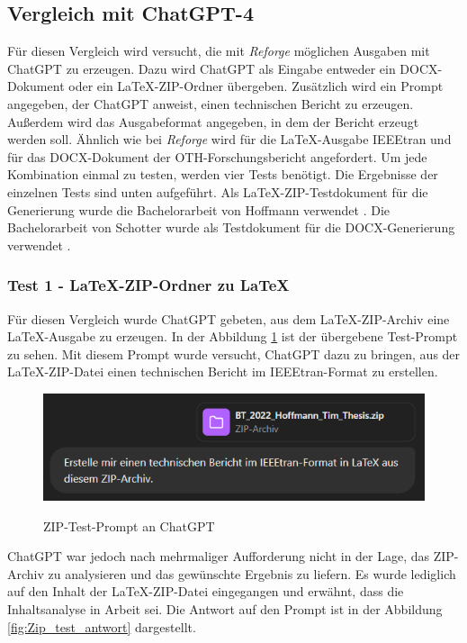 \subsection{Vergleich mit ChatGPT-4}
Für diesen Vergleich wird versucht, die mit \textit{Reforge} möglichen Ausgaben mit Chat\ac{GPT} zu erzeugen. Dazu wird Chat\ac{GPT} als Eingabe entweder ein \ac{DOCX}-Dokument oder ein LaTeX-ZIP-Ordner übergeben. Zusätzlich wird ein Prompt angegeben, der Chat\ac{GPT} anweist, einen technischen Bericht zu erzeugen. Außerdem wird das Ausgabeformat angegeben, in dem der Bericht erzeugt werden soll. Ähnlich wie bei \textit{Reforge} wird für die LaTeX-Ausgabe IEEEtran und für das \ac{DOCX}-Dokument der OTH-Forschungsbericht angefordert. Um jede Kombination einmal zu testen, werden vier Tests benötigt. Die Ergebnisse der einzelnen Tests sind unten aufgeführt.  Als LaTeX-ZIP-Testdokument für die Generierung wurde die Bachelorarbeit von Hoffmann verwendet \cite{hoffmann_tim_2022bt}. Die Bachelorarbeit von Schotter wurde als Testdokument für die \ac{DOCX}-Generierung verwendet \cite{schotter_tobias_2022bt}.

\subsubsection{Test 1 - LaTeX-ZIP-Ordner zu LaTeX}

Für diesen Vergleich wurde Chat\ac{GPT} gebeten, aus dem LaTeX-ZIP-Archiv eine LaTeX-Ausgabe zu erzeugen. In der Abbildung \ref{fig:Zip_test_anfrage} ist der übergebene Test-Prompt zu sehen. Mit diesem Prompt wurde versucht, Chat\ac{GPT} dazu zu bringen, aus der LaTeX-ZIP-Datei einen technischen Bericht im IEEEtran-Format zu erstellen.

\begin{figure}[H]
\centering
\includegraphics[width=0.8\linewidth]{Images/Zip_test_anfrage.png}\\
\caption{ZIP-Test-Prompt an ChatGPT}
\label{fig:Zip_test_anfrage}
\end{figure}

Chat\ac{GPT} war jedoch nach mehrmaliger Aufforderung nicht in der Lage, das ZIP-Archiv zu analysieren und das gewünschte Ergebnis zu liefern. Es wurde lediglich auf den Inhalt der LaTeX-ZIP-Datei eingegangen und erwähnt, dass die Inhaltsanalyse in Arbeit sei. Die Antwort auf den Prompt ist in der Abbildung \ref{fig:Zip_test_antwort} dargestellt.

